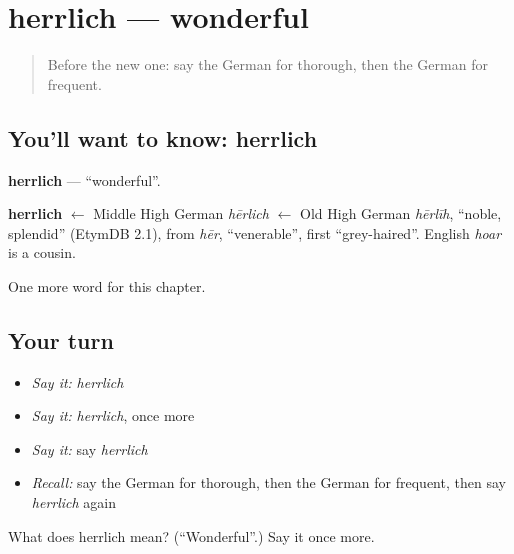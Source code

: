 \section[herrlich]{herrlich — wonderful}

\label{lesson:GE-C216-herrlich}



\begin{quote}
Before the new one: say the German for thorough, then the German for frequent.
\end{quote}

\subsection*{You'll want to know: herrlich}
\textbf{herrlich} — \textquotedblleft{}wonderful\textquotedblright{}.

\begin{cousinweb}
\textbf{herrlich} $\leftarrow$ Middle High German \emph{hērlich} $\leftarrow$ Old High German \emph{hērlīh}, \textquotedblleft{}noble, splendid\textquotedblright{} (EtymDB 2.1), from \emph{hēr}, \textquotedblleft{}venerable\textquotedblright{}, first \textquotedblleft{}grey-haired\textquotedblright{}. English \emph{hoar} is a cousin.
\end{cousinweb}

\begin{grammarlens}[title={What you've built}]
One more word for this chapter.
\end{grammarlens}

\subsection*{Your turn}
\begin{itemize}
\raggedright
  \item \emph{Say it:} \emph{herrlich}
  \item \emph{Say it:} \emph{herrlich}, once more
  \item \emph{Say it:} say \emph{herrlich}
  \item \emph{Recall:} say the German for thorough, then the German for frequent, then say \emph{herrlich} again
\end{itemize}

\begin{tcolorbox}[breakable,colback=teal!4,colframe=teal!35!black,title={Before you move on}]
What does herrlich mean? (\textquotedblleft{}Wonderful\textquotedblright{}.) Say it once more.
\end{tcolorbox}

